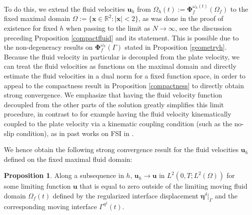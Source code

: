 \documentclass[11pt]{article}
\newcommand{\bd}{\boldsymbol}
\def\R{{\mathbb R}}
\theoremstyle{definition}
\newtheorem{proposition}{Proposition}[section]
\begin{document}
To do this, we extend the fluid velocities $\bd{u}_{h}$ from $\Omega_{h}(t) := \bd{\Phi}^{\omega_{h}(t)}_{f}(\Omega_{f})$ to the fixed maximal domain $\Omega := \{\bd{x} \in \R^{2} : |\bd{x}| < 2\}$, as was done in the proof of existence for fixed $h$ when passing to the limit as $N \to \infty$, see the discussion preceding Proposition \ref{compactfluid} and its statement. This is possible due to the non-degeneracy results on $\bd{\Phi}^{\omega_{h}}_{f}(\Gamma)$ stated in Proposition \ref{geometryh}. Because the fluid velocity in particular is decoupled from the plate velocity, we can treat the fluid velocities as functions on the maximal domain and directly estimate the fluid velocities in a dual norm for a fixed function space, in order to appeal to the compactness result in Proposition \ref{compactness} to directly obtain strong convergence. We emphasize that having the fluid velocity function decoupled from the other parts of the solution greatly simplifies this limit procedure, in contrast to for example having the fluid velocity kinematically coupled to the plate velocity via a kinematic coupling condition (such as the no-slip condition), as in past works on FSI in \cite{AubinLions,CanicLectureNotes, MS22}. 

We hence obtain the following strong convergence result for the fluid velocities $\bd{u}_{h}$ defined on the fixed maximal fluid domain:
\begin{proposition}
Along a subsequence in $h$, $\bd{u}_{h} \to \bd{u}$ in $L^{2}(0, T; L^{2}(\Omega))$ for some limiting function $\bd{u}$ that is equal to zero outside of the limiting moving fluid domain $\Omega_{f}(t)$ defined by the regularized interface displacement $\bd{\eta}^{\delta}|_{\Gamma}$ and the corresponding moving interface $\Gamma^{\eta^{\delta}}(t)$. 
\end{proposition}
\end{document}
